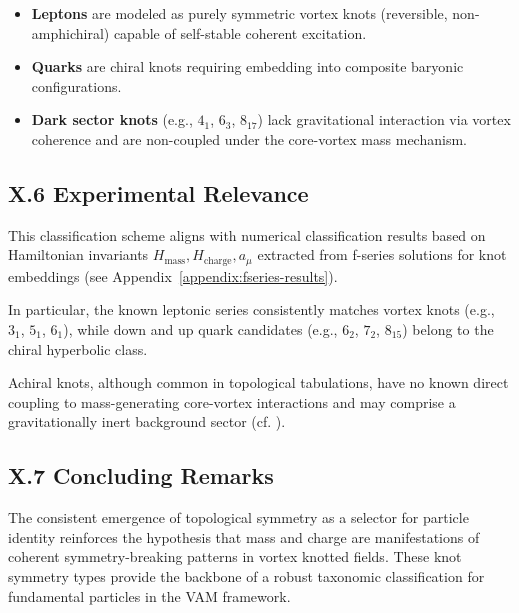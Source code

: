 \documentclass[11pt]{article}
\begin{document}
    \begin{itemize}
        \item \textbf{Leptons} are modeled as purely symmetric vortex knots (reversible, non-amphichiral) capable of self-stable coherent excitation.
        \item \textbf{Quarks} are chiral knots requiring embedding into composite baryonic configurations.
        \item \textbf{Dark sector knots} (e.g., $4_1$, $6_3$, $8_{17}$) lack gravitational interaction via vortex coherence and are non-coupled under the core-vortex mass mechanism.
    \end{itemize}

    \subsection*{X.6 Experimental Relevance}

    This classification scheme aligns with numerical classification results based on Hamiltonian invariants $H_\text{mass}, H_\text{charge}, a_\mu$ extracted from f-series solutions for knot embeddings (see Appendix~\ref{appendix:fseries-results}).

    In particular, the known leptonic series consistently matches vortex knots (e.g., $3_1$, $5_1$, $6_1$), while down and up quark candidates (e.g., $6_2$, $7_2$, $8_15$) belong to the chiral hyperbolic class.

    Achiral knots, although common in topological tabulations, have no known direct coupling to mass-generating core-vortex interactions and may comprise a gravitationally inert background sector (cf. \cite{VAMChapters}).

    \subsection*{X.7 Concluding Remarks}

    The consistent emergence of topological symmetry as a selector for particle identity reinforces the hypothesis that mass and charge are manifestations of coherent symmetry-breaking patterns in vortex knotted fields. These knot symmetry types provide the backbone of a robust taxonomic classification for fundamental particles in the VAM framework.

    
    
\end{document}
